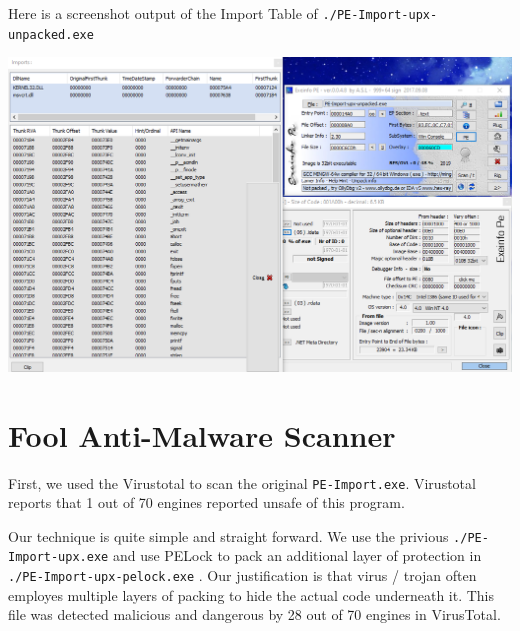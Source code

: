 \documentclass[11pt]{article}
\begin{document}
Here is a screenshot output of the Import Table of \lstinline{./PE-Import-upx-unpacked.exe} 
\begin{center}
    \includegraphics[width=\textwidth]{Assignment/2/Q1/sc_import_table_pe_upx_unpacked.png}
\end{center}

\section{Fool Anti-Malware Scanner}

First, we used the Virustotal to scan the original \lstinline{PE-Import.exe}. Virustotal reports that 1 out of 70 engines reported unsafe of this program. 

Our technique is quite simple and straight forward. We use the privious \lstinline{./PE-Import-upx.exe} and use PELock to pack an additional layer of protection in \lstinline{./PE-Import-upx-pelock.exe} . Our justification is that virus / trojan often employes multiple layers of packing to hide the actual code underneath it. This file was detected malicious and dangerous by 28 out of 70 engines in VirusTotal. 



\end{document}
